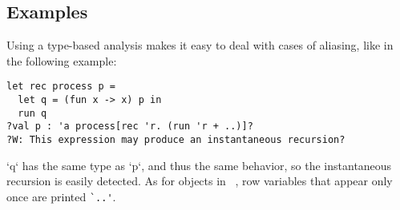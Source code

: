 \documentclass[9pt,preprint]{sigplanconf}
\begin{document}
\subsection{Examples}
%

Using a type-based analysis makes it easy to deal with cases of aliasing, like in the following example:
\begin{lstlisting}
let rec process p =
  let q = (fun x -> x) p in
  run q 
?val p : 'a process[rec 'r. (run 'r + ..)]?
?W: This expression may produce an instantaneous recursion?
\end{lstlisting}
`q` has the same type as `p`, and thus the same behavior, so the instantaneous recursion is easily detected. As for objects in \ocaml~\cite{Vouillon:2008}, row variables that appear only once are printed \verb+`..'+.
\end{document}
